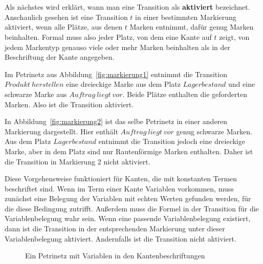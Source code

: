 	\\\\
	Als nächstes wird erklärt, wann man eine Transition als \textbf{aktiviert} bezeichnet. Anschaulich gesehen ist eine Transition $t$ in einer bestimmten Markierung aktiviert, wenn alle Plätze, aus denen $t$ Marken entnimmt, dafür genug Marken beinhalten.
	Formal muss also jeder Platz, von dem eine Kante auf $t$ zeigt, von jedem Markentyp genauso viele oder mehr Marken beinhalten als in der Beschriftung der Kante angegeben.

	Im Petrinetz aus Abbildung~\ref{fig:markierung1} entnimmt die Transition $Produkt\ herstellen$ eine dreieckige Marke aus dem Platz $Lagerbestand$ und eine schwarze Marke aus $Auftrag\ liegt\ vor$. Beide Plätze enthalten die geforderten Marken. Also ist die Transition aktiviert.

	In Abbildung~\ref{fig:markierung2} ist das selbe Petrinetz in einer anderen Markierung dargestellt. Hier enthält $Auftrag\ liegt\ vor$ genug schwarze Marken. Aus dem Platz $Lagerbestand$ entnimmt die Transition jedoch eine dreieckige Marke, aber in dem Platz sind nur Rautenförmige Marken enthalten. Daher ist die Transition in Markierung 2 nicht aktiviert.

	Diese Vorgehensweise funktioniert für Kanten, die mit konstanten Termen beschriftet sind. Wenn im Term einer Kante Variablen vorkommen, muss zunächst eine Belegung der Variablen mit echten Werten gefunden werden, für die diese Bedingung zutrifft. Außerdem muss die Formel in der Transition für die Variablenbelegung wahr sein. Wenn eine passende Variablenbelegung existiert, dann ist die Transition in der entsprechenden Markierung unter dieser Variablenbelegung aktiviert. Andernfalls ist die Transition nicht aktiviert.

	\begin{figure}[h]
		\centering
		\caption{Ein Petrinetz mit Variablen in den Kantenbeschriftungen}
		\label{fig:varkanten1}
	\end{figure}


